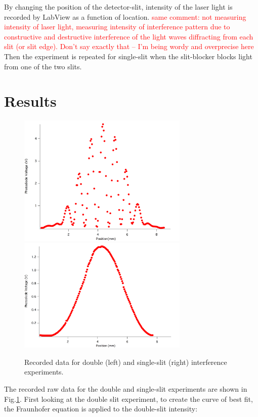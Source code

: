 \documentclass[prb,preprint]{revtex4-1}
\begin{document}
By changing the position of the detector-slit, intensity of the laser light is recorded by LabView as a function of location. \textcolor{red}{same comment: not measuring intensity of laser light, measuring intensity of interference pattern due to constructive and destructive interference of the light waves diffracting from each slit (or slit edge). Don't say exactly that -- I'm being wordy and overprecise here}  Then the experiment is repeated for single-slit when the slit-blocker blocks light from one of the two slits. \\
\section{Results}

\begin{figure}[h]
\centering
\includegraphics[width=3.2in]{doubleres.png}
\includegraphics[width=3.2in]{singleres.png}
\caption{Recorded data for double (left) and single-slit (right) interference experiments.}
\label{ds}
\end{figure}

\newpage

The recorded raw data for the double and single-slit experiments are shown in Fig.\ref{ds}. First looking at the double slit experiment, to create the curve of best fit, the Fraunhofer equation is applied to the double-slit intensity: 
\end{document}
